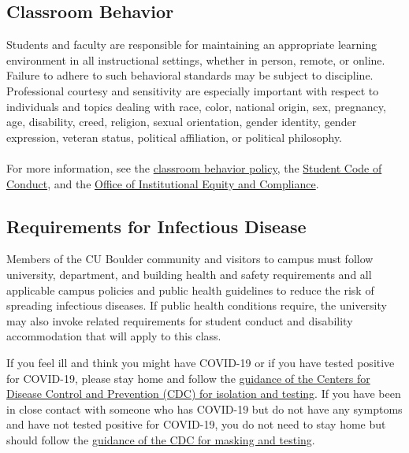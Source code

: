 \subsection*{Classroom Behavior}

Students and faculty are responsible for maintaining an appropriate
learning environment in all instructional settings, whether in person,
remote, or online. Failure to adhere to such behavioral standards may be
subject to discipline. Professional courtesy and sensitivity are
especially important with respect to individuals and topics dealing with
race, color, national origin, sex, pregnancy, age, disability, creed,
religion, sexual orientation, gender identity, gender expression,
veteran status, political affiliation, or political philosophy.\\
~\\
For more information, see the
\href{http://www.colorado.edu/policies/student-classroom-and-course-related-behavior}{{classroom
behavior policy}}, the
\href{https://www.colorado.edu/sccr/student-conduct}{{Student Code of
Conduct}}, and the \href{https://www.colorado.edu/oiec/}{{Office of
Institutional Equity and Compliance}}.

\subsection*{Requirements for Infectious Disease}

Members of the CU Boulder community and visitors to campus must follow
university, department, and building health and safety requirements and
all applicable campus policies and public health guidelines to reduce
the risk of spreading infectious diseases. If public health conditions
require, the university may also invoke related requirements for student
conduct and disability accommodation that will apply to this class.

If you feel ill and think you might have COVID-19 or if you have tested
positive for COVID-19, please stay home and follow the
\href{https://www.cdc.gov/coronavirus/2019-ncov/your-health/isolation.html}{{guidance
of the Centers for Disease Control and Prevention (CDC) for isolation
and testing}}. If you have been in close contact with someone who has
COVID-19 but do not have any symptoms and have not tested positive for
COVID-19, you do not need to stay home but should follow the
\href{https://www.cdc.gov/coronavirus/2019-ncov/your-health/if-you-were-exposed.html}{{guidance
of the CDC for masking and testing}}.

